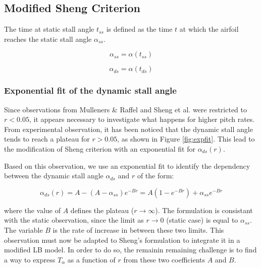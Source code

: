 \subsection{Modified Sheng Criterion}
\label{section:expfit}

The time at static stall angle $t_{ss}$ is defined as the time $t$ at which the airfoil reaches the static stall angle $\alpha_{ss}$.

\begin{equation}
\alpha_{ss} = \alpha(t_{ss})
\end{equation}

\begin{equation}
	\alpha_{ds} = \alpha(t_{ds})
\end{equation}

\subsubsection{Exponential fit of the dynamic stall angle}

Since observations from Mulleners \& Raffel \cite{mulleners_onset_2010,mulleners_onset_2012,mulleners_dynamic_2013} and Sheng et al. \cite{sheng_new_2006,sheng_modified_2008} were restricted to $r<0.05$, it appears necessary to investigate what happens for higher pitch rates. From experimental observation, it has been noticed that the dynamic stall angle tends to reach a plateau for $r>0.05$, as shown in Figure  \ref{fig:expfit}. This lead to the modification of Sheng criterion with an exponential fit for $\alpha_{ds}(r)$.

Based on this observation, we use an exponential fit to identify the dependency between the dynamic stall angle $\alpha_{ds}$ and $r$ of the form: 

\begin{equation}
\alpha_{ds}(r) = A-(A-\alpha_{ss})e^{-Br} = A(1-e^{-Br})+\alpha_{ss}e^{-Br}
\label{eq:alpha_ds_r}
\end{equation}

\noindent where the value of $A$ defines the plateau ($r \rightarrow \infty$). The formulation is consistant with the static observation, since the limit as $r \rightarrow 0$ (static case) is equal to $\alpha_{ss}$. The variable $B$ is the rate of increase in between these two limits. This observation must now be adapted to Sheng's formulation to integrate it in a modified LB model. In order to do so, the remainin remaining challenge is to find a way to express $T_\alpha$ as a function of $r$ from these two coefficients $A$ and $B$.

